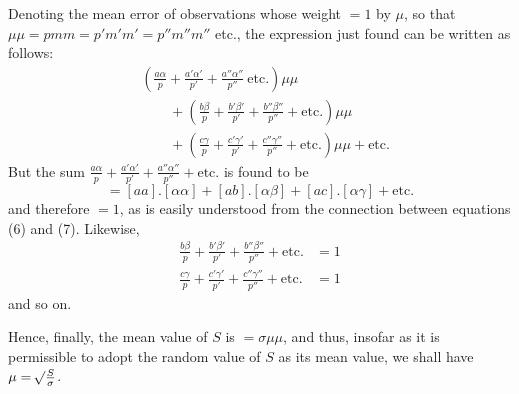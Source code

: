 Denoting the mean error of observations whose weight \(=1\) by \(\mu\), so that \(\mu\mu=pmm=p'm'm'=p''m''m''\) etc., the expression just found can be written as follows:
\[
\begin{aligned}
&\left(\frac{a\alpha}{p}+\frac{a'\alpha'}{p'}+\frac{a''\alpha''}{p''}\ \text{etc.}\right)\mu\mu
\\&\qquad+\left(\frac{b\beta}{p}+\frac{b'\beta'}{p'}+\frac{b''\beta''}{p''}+\text{etc.}\right)\mu\mu\\
&\qquad+\left(\frac{c\gamma}{p}+\frac{c'\gamma'}{p'}+\frac{c''\gamma''}{p''}+\text{etc.}\right)\mu\mu+\text{etc.}
\end{aligned}
\]
But the sum \(\frac{a\alpha}{p}+\frac{a'\alpha'}{p'}+\frac{a''\alpha''}{p''}+\text{etc.}\) is found to be
\[
=[aa].[\alpha\alpha]+[ab].[\alpha\beta]+[ac].[\alpha\gamma]+\text{etc.}
\]
and therefore \(=1\), as is easily understood from the connection between equations (6) and (7). Likewise,
\[
\begin{aligned}
\frac{b\beta}{p}+\frac{b'\beta'}{p'}+\frac{b''\beta''}{p''}+\text{etc.}&=1\\[5pt]
\frac{c\gamma}{p}+\frac{c'\gamma'}{p'}+\frac{c''\gamma''}{p''}+\text{etc.}&=1
\end{aligned}
\]
and so on.

Hence, finally, the mean value of \(S\) is \(=\sigma\mu\mu\), and thus, insofar as it is permissible to adopt the random value of \(S\) as its mean value, we shall have \(\mu=\mathord{{}^{}\!\surd}\frac S\sigma\).

\clearpage
